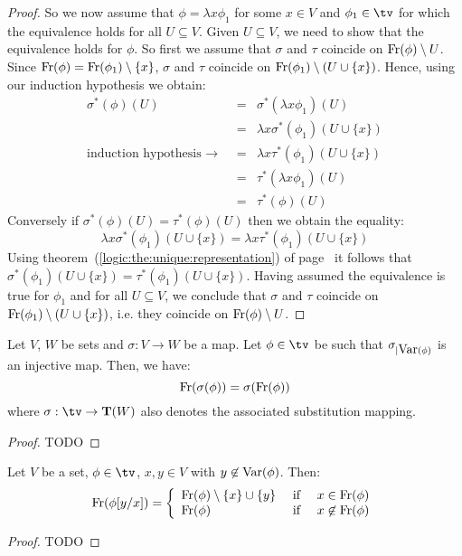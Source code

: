 \begin{proof}
    So we now assume that $\phi=\lambda x\phi_{1}$ for some $x\in V$ and
    $\phi_{1}\in\tv$ for which the equivalence holds for all $U\subseteq V$.
    Given $U\subseteq V$, we need to show that the equivalence holds for 
    $\phi$. So first we assume that $\sigma$ and $\tau$ coincide on
    $\mbox{\rm Fr}(\phi)\setminus U$. Since $\mbox{\rm Fr}(\phi)=\mbox{\rm Fr}(\phi_{1})\setminus\{x\}$,
    $\sigma$ and $\tau$ coincide on $\mbox{\rm Fr}(\phi_{1})\setminus (U\cup\{x\})$.
    Hence, using our induction hypothesis we obtain:
        \begin{eqnarray*}\sigma^{*}(\phi)(U)
            &=&\sigma^{*}(\lambda x\phi_{1})(U)\\
            &=&\lambda x\sigma^{*}(\phi_{1})(U\cup\{x\})\\
            \mbox{induction hypothesis\ $\rightarrow$\ }
            &=&\lambda x\tau^{*}(\phi_{1})(U\cup\{x\})\\
            &=&\tau^{*}(\lambda x \phi_{1})(U)\\
            &=&\tau^{*}(\phi)(U)
        \end{eqnarray*}
    Conversely if $\sigma^{*}(\phi)(U)=\tau^{*}(\phi)(U)$ then we obtain
    the equality:
        \[
            \lambda x\sigma^{*}(\phi_{1})(U\cup\{x\})
            =
            \lambda x\tau^{*}(\phi_{1})(U\cup\{x\})
        \]
    Using theorem~(\ref{logic:the:unique:representation}) of
    page~\pageref{logic:the:unique:representation} it follows that
    $\sigma^{*}(\phi_{1})(U\cup\{x\})=\tau^{*}(\phi_{1})(U\cup\{x\})$.
    Having assumed the equivalence is true for $\phi_{1}$ and for all 
    $U\subseteq V$, we conclude that $\sigma$ and $\tau$ coincide on
    $\mbox{\rm Fr}(\phi_{1})\setminus(U\cup\{x\})$, i.e. they coincide on
    $\mbox{\rm Fr}(\phi)\setminus U$.
\end{proof}

\begin{prop}\label{logic:prop:LAM:freevar:of:substitution}
    Let $V$, $W$ be sets and $\sigma:V\to W$ be a map. Let $\phi\in\tv$ 
    be such that $\sigma_{|\mbox{\rm Var}(\phi)}$ is an injective map. Then, we have:
    \[
        \mbox{\rm Fr}(\sigma(\phi))=\sigma(\mbox{\rm Fr}(\phi))
    \]
    where $\sigma:\tv\to{\bf T}(W)$ also denotes the associated substitution 
    mapping.
\end{prop}
\begin{proof}
TODO
\end{proof}

\begin{prop}\label{logic:prop:LAM:freevar:single:subst}
    Let $V$ be a set, $\phi\in\tv$, $x,y\in V$ with $y\not\in\mbox{\rm Var}(\phi)$. Then:
    \[
        \mbox{\rm Fr}(\phi[y/x])=
            \left\{\begin{array}{lcl}
                \mbox{\rm Fr}(\phi)\setminus\{x\}\cup\{y\}
                    &\mbox{\ if\ }&
                x\in\mbox{\rm Fr}(\phi)
                \\
                \mbox{\rm Fr}(\phi)
                    &\mbox{\ if\ }&
                x\not\in\mbox{\rm Fr}(\phi)
            \end{array}\right.
    \]
\end{prop}
\begin{proof}
TODO
\end{proof}

